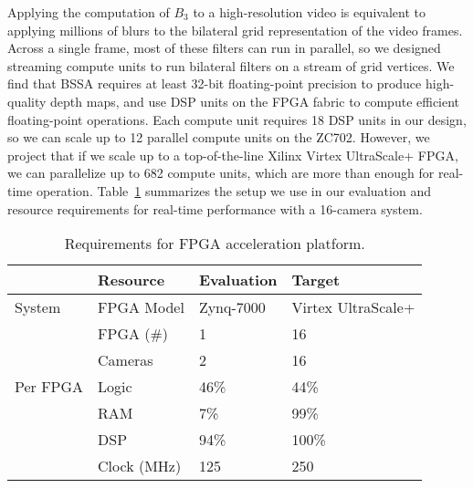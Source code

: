 Applying the computation of $B_3$ to a high-resolution video is equivalent to applying millions of blurs to the bilateral grid representation of the video frames. Across a single frame, most of these filters can run in parallel, so we designed streaming compute units to run bilateral filters on a stream of grid vertices. We find that BSSA requires at least 32-bit floating-point precision to produce high-quality depth maps, and use DSP units on the FPGA fabric to compute efficient floating-point operations. Each compute unit requires 18 DSP units in our design, so we can scale up to 12 parallel compute units on the ZC702. However, we project that if we scale up to a top-of-the-line Xilinx Virtex UltraScale+ FPGA, we can parallelize up to 682 compute units, which are more than enough for real-time operation. Table~\ref{table:vr-resources} summarizes the setup we use in our evaluation and resource requirements for real-time performance with a 16-camera system.

\begin{table}[h]
  \centering
\caption{Requirements for FPGA acceleration platform.}
  \begin{tabular}{ l @{\hskip 6pt}l @{\hskip 6pt}l @{\hskip 6pt}l  }
\toprule
 & \textbf{Resource} & \textbf{Evaluation} & \textbf{Target} \\
\midrule
System   & FPGA Model       & Zynq-7000 & Virtex UltraScale+ \\
         & FPGA (\#)        & 1                 & 16                       \\
         & Cameras          & 2                 & 16                       \\
\midrule
Per FPGA & Logic            & 46\%           & 44\%                  \\
         & RAM              & 7\%            & 99\%                  \\
         & DSP              & 94\%           & 100\%                  \\
         & Clock (MHz)      & 125               & 250       \\
\bottomrule
\end{tabular}


\label{table:vr-resources}
\end{table}

